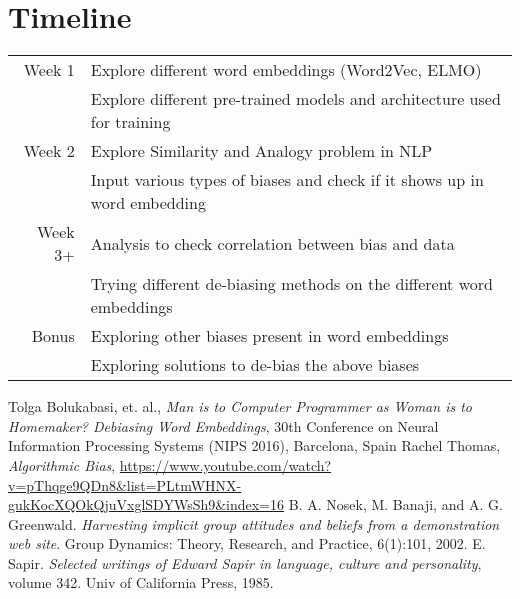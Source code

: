 \documentclass[12pt, a4paper]{article}
\newcommand{\foo}{\hspace{-3pt}$\bullet$ \hspace{5pt}}
\begin{document}
	
	\section{Timeline}
		\renewcommand{\arraystretch}{2.3}
		\begin{tabular}{r |@{\foo} l}
			
			Week 1 & Explore different word embeddings (Word2Vec, ELMO)\\
			& Explore different pre-trained models and architecture used for training\\
			Week 2 & Explore Similarity and Analogy problem in NLP \\
			& Input various types of biases and check if it shows up in word embedding\\
			Week 3+ & Analysis to check correlation between bias and data\\
			& Trying different de-biasing methods on the different word embeddings\\
			Bonus & Exploring other biases present in word embeddings\\
			& Exploring solutions to de-bias the above biases\\
		\end{tabular}
		
		
	\begin{thebibliography}{10}
		
		 Tolga Bolukabasi, et. al., \emph{Man is to Computer Programmer as Woman is to Homemaker? Debiasing Word Embeddings}, 30th Conference on Neural Information Processing Systems (NIPS 2016), Barcelona, Spain
		 Rachel Thomas, \emph{Algorithmic Bias}, \url{https://www.youtube.com/watch?v=pThqge9QDn8&list=PLtmWHNX-gukKocXQOkQjuVxglSDYWsSh9&index=16}
		 B. A. Nosek, M. Banaji, and A. G. Greenwald. \emph{Harvesting implicit group attitudes and beliefs from a demonstration web site}. Group Dynamics: Theory, Research, and Practice, 6(1):101, 2002.
		  E. Sapir. \emph{Selected writings of Edward Sapir in language, culture and personality}, volume 342. Univ of California Press, 1985.
		
	\end{thebibliography}
\end{document}
